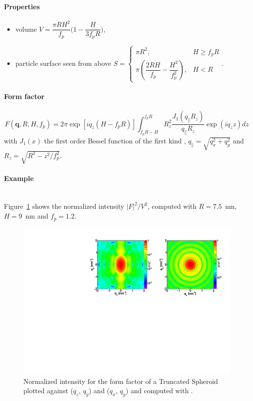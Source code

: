 \paragraph{Properties}
\begin{itemize}
\item volume $V = \dfrac{\pi R H^2}{f_p}  \Big(1-\dfrac{H}{3f_p R}\Big)$,
\item particle surface seen from above $S = \left\{\begin{array}{ll} \pi R^2, & H \geq f_pR \\
         \pi\left(\dfrac{2RH}{f_p}-\dfrac{H^2}{f_p^2}\right), & H < R \end{array}\right.$.
\end{itemize}

\paragraph{Form factor}
\begin{equation*} 
F(\mathbf{q},R, H,f_p) =   2\pi \exp[iq_z(H-f_pR)] \int_{f_p R-H} ^{f_p R} R_z
        ^2\frac{J_1(q_{\parallel}R_z)}{q_{\parallel}R_z} \exp(i q_z z) dz
\end{equation*}
with $J_1(x)$ the first order
Bessel function of the first kind \cite{AbSt64}, $q_{\parallel}=\sqrt{q_x^2+q_y^2} $ and $R_z=\sqrt{R^2-z^2/f_p^2}$.


\paragraph{Example}\strut\\
Figure~\ref{fig:FFspheroidEx} shows the normalized intensity
$|F|^2/V^2$, computed with $R=7.5$~nm, $H=9$~nm and $f_p=1.2$.

\begin{figure}[h]
\begin{center}
\includegraphics[angle=-90,width=\textwidth]{fig/ff/figffspheroid.pdf}
\end{center}
\caption{Normalized intensity for the form factor of a Truncated Spheroid plotted against ($q_z$, $q_y$) and ($q_x$, $q_y$) and
  computed with .}
\label{fig:FFspheroidEx}
\end{figure}

